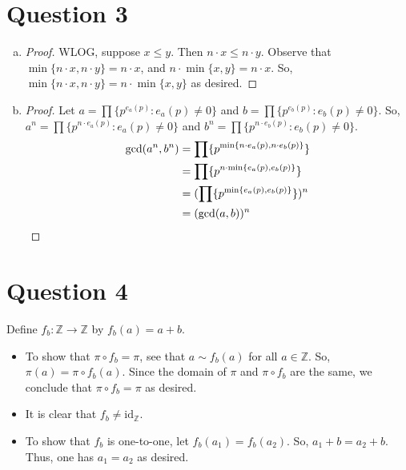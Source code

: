 \documentclass{article}
\begin{document}
\section*{Question 3}
\begin{enumerate}[(a)]
    \item \begin{proof}
        WLOG, suppose $x\leq{y}$. Then $n\cdot{x}\leq n\cdot{y}$. Observe that $\min\{n\cdot{x},n\cdot{y}\}=n\cdot{x}$, and $n\cdot\min\{x,y\}=n\cdot{x}$. So, $\min\{n\cdot{x},n\cdot{y}\}=n\cdot\min\{x,y\}$ as desired.
    \end{proof}
    \item \begin{proof}
        Let $a=\prod\{p^{e_a(p)}:{e_a(p)\neq0}\}$ and $b=\prod\{p^{e_b(p)}:{e_b(p)\neq0}\}$. So, $a^n=\prod\{p^{n\cdot{e_a(p)}}:{e_a(p)\neq0}\}$ and $b^n=\prod\{p^{n\cdot{e_b(p)}}:{e_b(p)\neq0}\}$.
        \begin{equation}
\begin{split}
\text{gcd}(a^n,b^n) & = \prod\{p^{\text{min}\{n\cdot{e_a(p)},n\cdot{e_b(p)\}}}\} \\
 & = \prod\{p^{n\cdot\text{min}\{{e_a(p)},{e_b(p)\}}}\} \\
 & = (\prod\{p^{\text{min}\{{e_a(p)},{e_b(p)\}}}\})^n\\
 & = (\text{gcd}(a,b))^n
\end{split}\notag
\end{equation}
    \end{proof}
\end{enumerate}
\newpage
\section*{Question 4}
Define $f_b:\mathbb{Z}\rightarrow\mathbb{Z}$ by $f_b(a)=a+b$. 
\begin{itemize}
    \item To show that $\pi\circ{f_b}=\pi$, see that $a\sim{f_b(a)}$ for all $a\in\mathbb{Z}$. So, $\pi(a)=\pi\circ{f_b(a)}$. Since the domain of $\pi$ and $\pi\circ{f_b}$ are the same, we conclude that $\pi\circ{f_b}=\pi$ as desired.
    \item It is clear that $f_b\neq\text{id}_\mathbb{Z}$.
    \item To show that $f_b$ is one-to-one, let $f_b(a_1)=f_b(a_2)$. So, $a_1+b=a_2+b$. Thus, one has $a_1=a_2$ as desired.
\end{itemize}
\end{document}
